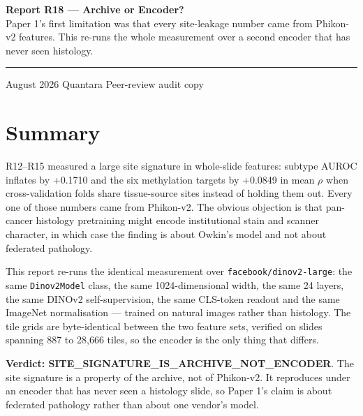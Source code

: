 \documentclass[11pt,a4paper]{article}
\begin{document}
\thispagestyle{empty}
\noindent
{\large\bfseries\color{qnavy} Report R18 --- Archive or Encoder?}\\[2pt]
{\color{qgrey}Paper 1's first limitation was that every site-leakage number came from
Phikon-v2 features. This re-runs the whole measurement over a second encoder that has never seen
histology.}\\[6pt]
{\color{qgrey}\rule{\textwidth}{0.4pt}}

\medskip
{} August 2026 \quad\textbullet\quad Quantara \quad\textbullet\quad
{\color{qgrey}Peer-review audit copy}

\medskip
{}

\section*{Summary}

R12--R15 measured a large site signature in whole-slide features: subtype AUROC inflates by
+0.1710 and the six methylation targets by +0.0849 in
mean $\rho$ when cross-validation folds share tissue-source sites instead of holding them out.
Every one of those numbers came from Phikon-v2. The obvious objection is that pan-cancer histology
pretraining might encode institutional stain and scanner character, in which case the finding is
about Owkin's model and not about federated pathology.

This report re-runs the identical measurement over \texttt{facebook/dinov2-large}: the same
\texttt{Dinov2Model} class, the same 1024-dimensional width, the same 24 layers, the same DINOv2
self-supervision, the same CLS-token readout and the same ImageNet normalisation --- trained on
natural images rather than histology. The tile grids are byte-identical between the two feature
sets, verified on slides spanning 887 to 28{,}666 tiles, so the encoder is the only thing that
differs.

\textbf{Verdict: SITE\_SIGNATURE\_IS\_ARCHIVE\_NOT\_ENCODER}. The site signature is a property of the archive, not of Phikon-v2. It reproduces under an encoder that has never seen a histology slide, so Paper 1's claim is about federated pathology rather than about one vendor's model.
\end{document}

